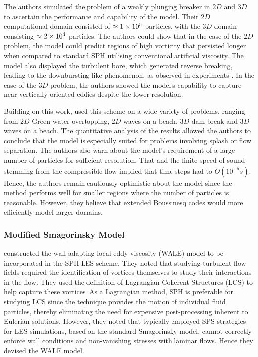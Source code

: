The authors simulated the problem of a weakly plunging breaker in $2D$ and $3D$ to ascertain the performance and capability of the model. Their $2D$ computational domain consisted of $\approx 1 \times {10}^{5}$ particles, with the $3D$ domain consisting $\approx 2 \times {10}^{4}$ particles.
The authors could show that in the case of the $2D$ problem, the model could predict regions of high vorticity that persisted longer when compared to standard SPH utilising conventional artificial viscosity. The model also displayed the turbulent bore, which generated reverse breaking, leading to the downbursting-like phenomenon, as observed in experiments \parencite{kubo2001large}.
In the case of the $3D$ problem, the authors showed the model’s capability to capture near vertically-oriented eddies despite the lower resolution. 

Building on this work, \cite{Dalrymple2006} used this scheme on a wide variety of problems, ranging from $2D$ Green water overtopping, $2D$ waves on a beach, $3D$ dam break and $3D$ waves on a beach. The quantitative analysis of the results allowed the authors to conclude that the model is especially suited for problems involving splash or flow separation. The authors also warn about the model’s requirement of a large number of particles for sufficient resolution. That and the finite speed of sound stemming from the compressible flow implied that time steps had to $O(10^{-5}s)$. Hence, the authors remain cautiously optimistic about the model since the method performs well for smaller regions where the number of particles is reasonable. However, they believe that extended Boussinesq codes would more efficiently model larger domains.

\subsubsection{Modified Smagorinsky Model}
\label{sec:Modified-Smagorinsky-Model}
\cite{Canelas2016} constructed the wall-adapting local eddy viscosity (WALE) model to be incorporated in the SPH-LES scheme. They noted that studying turbulent flow fields required the identification of vortices themselves to study their interactions in the flow. They used the definition of Lagrangian Coherent Structures (LCS) to help capture these vortices. As a Lagrangian method, SPH is preferable for studying LCS since the technique provides the motion of individual fluid particles, thereby eliminating the need for expensive post-processing inherent to Eulerian solutions. 
However, they noted that typically employed SPS strategies for LES simulations, based on the standard Smagorinsky model, cannot correctly enforce wall conditions and non-vanishing stresses with laminar flows. Hence they devised the WALE model.

